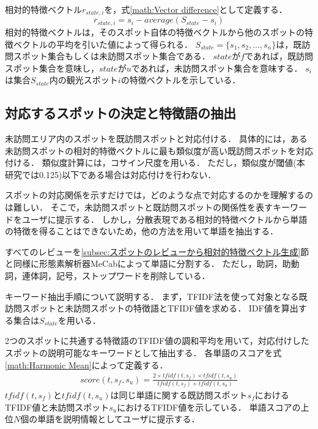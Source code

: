 \documentclass[submit]{ipsj}
\begin{document}
相対的特徴ベクトル$r_{state,i}$を，式\ref{math:Vector difference}として定義する．
\begin{equation}
  r_{state,i}=s_i-average(S_{state}-s_i)
  \label{math:Vector difference}
\end{equation}
相対的特徴ベクトルは，そのスポット自体の特徴ベクトルから他のスポットの特徴ベクトルの平均を引いた値によって得られる．
$S_{state} =\{s_1,s_2,\dots,s_n\}$は，既訪問スポット集合もしくは未訪問スポット集合である．
$state$が$f$であれば，既訪問スポット集合を意味し，$state$が$u$であれば，未訪問スポット集合を意味する．
$s_i$は集合$S_{state}$内の観光スポット$i$の特徴ベクトルを示している．

\subsection{対応するスポットの決定と特徴語の抽出}
\label{subsec:対応するスポットの決定と特徴語の抽出}
未訪問エリア内のスポットを既訪問スポットと対応付ける．
具体的には，ある未訪問スポットの相対的特徴ベクトルに最も類似度が高い既訪問スポットを対応付ける．
類似度計算には，コサイン尺度を用いる．
ただし，類似度が閾値(本研究では0.125)以下である場合は対応付けを行わない．

スポットの対応関係を示すだけでは，どのような点で対応するのかを理解するのは難しい．
そこで，未訪問スポットと既訪問スポットの関係性を表すキーワードをユーザに提示する．
しかし，分散表現である相対的特徴ベクトルから単語の特徴を得ることはできないため，他の方法を用いて単語を抽出する．

すべてのレビューを\ref{subsec:スポットのレビューから相対的特徴ベクトル生成}節と同様に形態素解析器MeCabによって単語に分割する．
ただし，助詞，助動詞，連体詞，記号，ストップワードを削除している．

キーワード抽出手順について説明する．
まず，TFIDF法を使って対象となる既訪問スポットと未訪問スポットの特徴語とTFIDF値を求める．
IDF値を算出する集合は$S_{state}$を用いる．

2つのスポットに共通する特徴語のTFIDF値の調和平均を用いて，対応付けしたスポットの説明可能なキーワードとして抽出する．
各単語のスコアを式\ref{math:Harmonic Mean}によって定義する．
\begin{eqnarray}
  score(t,s_f,s_u) = \frac{2 \times tfidf(t,s_f) \times tfidf(t,s_u)}{tfidf(t,s_f) + tfidf(t,s_u)}
  \label{math:Harmonic Mean}
\end{eqnarray}
$tfidf(t,s_f)$と$tfidf(t,s_u)$は同じ単語に関する既訪問スポット$s_f$におけるTFIDF値と未訪問スポット$s_u$におけるTFIDF値を示している．
単語スコアの上位$N$個の単語を説明情報としてユーザに提示する．
\end{document}
